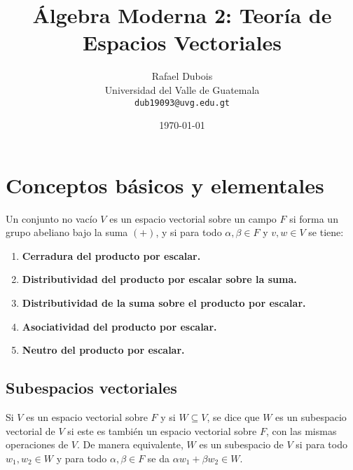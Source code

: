 \documentclass{article}
\title{Álgebra Moderna 2: Teoría de Espacios Vectoriales}
\author{\Large Rafael Dubois\\ Universidad del Valle de Guatemala \\ \texttt{dub19093@uvg.edu.gt}}
\date{\today}
\begin{document}
\maketitle
{}
\thispagestyle{fancy}

\section{Conceptos básicos y elementales}

Un conjunto no vacío $V$ es un espacio vectorial sobre un campo $F$ si forma un grupo abeliano bajo la suma $(+)$, y si para todo $\alpha,\beta\in F$ y $v,w\in V$ se tiene:
\begin{enumerate}

\item \textbf{Cerradura del producto por escalar.}

\item \textbf{Distributividad del producto por escalar sobre la suma.}

\item \textbf{Distributividad de la suma sobre el producto por escalar.}

\item \textbf{Asociatividad del producto por escalar.}

\item \textbf{Neutro del producto por escalar.}

\end{enumerate}

\subsection*{\color{violet} Subespacios vectoriales}

Si $V$ es un espacio vectorial sobre $F$ y si $W\subseteq V$, se dice que $W$ es un subespacio vectorial de $V$ si este es también un espacio vectorial sobre $F$, con las mismas operaciones de $V$. De manera equivalente, $W$ es un subespacio de $V$ si para todo $w_1,w_2\in W$ y para todo $\alpha,\beta\in F$ se da $\alpha w_1+\beta w_2\in W$.
\end{document}
